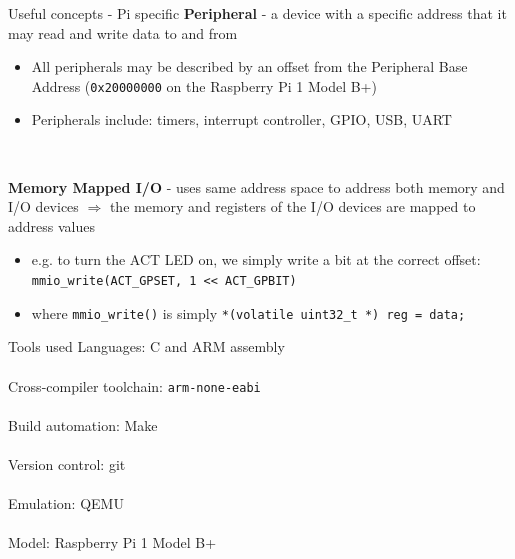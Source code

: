 \documentclass[10pt]{beamer}
\newcommand{\code}[1]{\texttt{#1}}
\begin{document}
\begin{frame}{Useful concepts - Pi specific}
    \textbf{Peripheral} - a device with a specific address that it may read and
    write data to and from
    \begin{itemize}
        \item All peripherals may be described by an offset from the Peripheral
            Base Address (\code{0x20000000} on the Raspberry Pi 1 Model B+)
        \item Peripherals include: timers, interrupt controller, GPIO, USB, UART
    \end{itemize} ~

    \textbf{Memory Mapped I/O} - uses same address space to address both memory
    and I/O devices $\Rightarrow$ the memory and registers of the I/O devices
    are mapped to address values
    \begin{itemize}
        \item e.g. to turn the ACT LED on, we simply write a bit at the correct
            offset: \code{mmio\_write(ACT\_GPSET, 1 << ACT\_GPBIT)}
        \item where \code{mmio\_write()} is simply \code{*(volatile uint32\_t *)
            reg = data;}
    \end{itemize}
\end{frame}

\begin{frame}{Tools used}
    Languages: C and ARM assembly \\~\\
    Cross-compiler toolchain: \texttt{arm-none-eabi} \\~\\
    Build automation: Make \\~\\
    Version control: git \\~\\
    Emulation: QEMU \\~\\
    Model: Raspberry Pi 1 Model B+
\end{frame}
\end{document}
